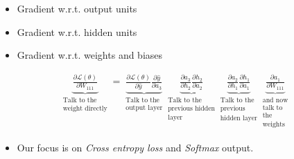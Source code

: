 \begin{frame}
  \begin{overlayarea}{\textwidth}{\textheight}
    \begin{itemize}
      \justifying
      \item<3-> Gradient w.r.t. output units
      \item<4-> Gradient w.r.t. hidden units
      \item<5-> Gradient w.r.t. weights and biases
    \end{itemize}

    \begin{align*}
      \underbrace{\frac{\partial \mathscr{L}(\theta)}{\partial W_{111}}}_
      {\substack{\text{Talk to the}\\ \text{weight directly}}}
      =
      \underbrace{\frac{\partial \mathscr{L}(\theta)}{\partial \hat{y}} \frac{\partial \hat{y}}{\partial a_{3}}}_
        {\substack{\text{Talk to the} \\ \text{output layer}}}
      \underbrace{\frac{\partial a_{3}}{\partial h_{2}} \frac{\partial h_{2}}{\partial a_{2}}}_
      {\substack{\text{Talk to the} \\ \text{previous hidden} \\ \text{layer}}}
      \underbrace{\frac{\partial a_{2}}{\partial h_{1}} \frac{\partial h_{1}}{\partial a_{1}}}_
      {\substack{\text{Talk to the} \\ \text{previous} \\ \text{hidden layer}}}
      \underbrace{\frac{\partial a_{1}}{\partial W_{111}}}_
      {\substack{\text{and now} \\ \text{talk to} \\ \text{the} \\ \text{weights}}}
    \end{align*}
    
    \begin{itemize}
      \justifying
      \item<6-> Our focus is on \textit{Cross entropy loss} and \textit{Softmax} output.
    \end{itemize}

  \end{overlayarea}
\end{frame}